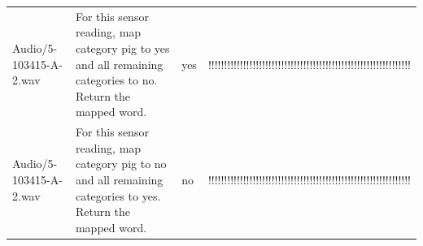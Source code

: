 {\begin{longtable}{@{}p{.13\linewidth}p{.37\linewidth}p{.13\linewidth}p{.28\linewidth}@{}}
Audio/\allowbreak{}5-103415-A-2.wav & For this sensor reading, map category pig to yes and all remaining categories to no. Return the mapped word. & yes & !\allowbreak{}!\allowbreak{}!\allowbreak{}!\allowbreak{}!\allowbreak{}!\allowbreak{}!\allowbreak{}!\allowbreak{}!\allowbreak{}!\allowbreak{}!\allowbreak{}!\allowbreak{}!\allowbreak{}!\allowbreak{}!\allowbreak{}!\allowbreak{}!\allowbreak{}!\allowbreak{}!\allowbreak{}!\allowbreak{}!\allowbreak{}!\allowbreak{}!\allowbreak{}!\allowbreak{}!\allowbreak{}!\allowbreak{}!\allowbreak{}!\allowbreak{}!\allowbreak{}!\allowbreak{}!\allowbreak{}!\allowbreak{}!\allowbreak{}!\allowbreak{}!\allowbreak{}!\allowbreak{}!\allowbreak{}!\allowbreak{}!\allowbreak{}!\allowbreak{}!\allowbreak{}!\allowbreak{}!\allowbreak{}!\allowbreak{}!\allowbreak{}!\allowbreak{}!\allowbreak{}!\allowbreak{}!\allowbreak{}!\allowbreak{}!\allowbreak{}!\allowbreak{}!\allowbreak{}!\allowbreak{}!\allowbreak{}!\allowbreak{}!\allowbreak{}!\allowbreak{}!\allowbreak{}!\allowbreak{}!\allowbreak{}!\allowbreak{}!\allowbreak{}!\allowbreak{} \\
Audio/\allowbreak{}5-103415-A-2.wav & For this sensor reading, map category pig to no and all remaining categories to yes. Return the mapped word. & no & !\allowbreak{}!\allowbreak{}!\allowbreak{}!\allowbreak{}!\allowbreak{}!\allowbreak{}!\allowbreak{}!\allowbreak{}!\allowbreak{}!\allowbreak{}!\allowbreak{}!\allowbreak{}!\allowbreak{}!\allowbreak{}!\allowbreak{}!\allowbreak{}!\allowbreak{}!\allowbreak{}!\allowbreak{}!\allowbreak{}!\allowbreak{}!\allowbreak{}!\allowbreak{}!\allowbreak{}!\allowbreak{}!\allowbreak{}!\allowbreak{}!\allowbreak{}!\allowbreak{}!\allowbreak{}!\allowbreak{}!\allowbreak{}!\allowbreak{}!\allowbreak{}!\allowbreak{}!\allowbreak{}!\allowbreak{}!\allowbreak{}!\allowbreak{}!\allowbreak{}!\allowbreak{}!\allowbreak{}!\allowbreak{}!\allowbreak{}!\allowbreak{}!\allowbreak{}!\allowbreak{}!\allowbreak{}!\allowbreak{}!\allowbreak{}!\allowbreak{}!\allowbreak{}!\allowbreak{}!\allowbreak{}!\allowbreak{}!\allowbreak{}!\allowbreak{}!\allowbreak{}!\allowbreak{}!\allowbreak{}!\allowbreak{}!\allowbreak{}!\allowbreak{}!\allowbreak{} \\
\bottomrule
\end{longtable}}\par

